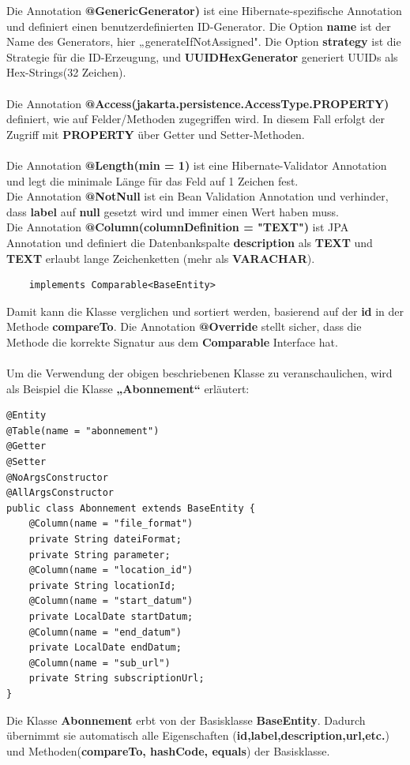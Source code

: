 \documentclass[a4paper,12pt]{scrreprt}
\begin{document}
	Die Annotation \textbf{@GenericGenerator)} ist eine Hibernate-spezifische Annotation und definiert einen benutzerdefinierten ID-Generator. Die Option \textbf{name} ist der Name des Generators, hier „generateIfNotAssigned". Die Option \textbf{strategy} ist die Strategie für die ID-Erzeugung, und \textbf{UUIDHexGenerator} generiert UUIDs als Hex-Strings(32 Zeichen).\\ \\
	Die Annotation \textbf{@Access(jakarta.persistence.AccessType.PROPERTY)} definiert, wie auf Felder/Methoden zugegriffen wird. In diesem Fall erfolgt der Zugriff mit \textbf{PROPERTY} über Getter und Setter-Methoden. \\ \\
	Die Annotation \textbf{@Length(min = 1)} ist eine Hibernate-Validator Annotation und legt die minimale Länge für das Feld auf 1 Zeichen fest.\\
	Die Annotation \textbf{@NotNull} ist ein Bean Validation Annotation und verhinder, dass \textbf{label} auf \textbf{null} gesetzt wird und immer einen Wert haben muss.\\
	Die Annotation \textbf{@Column(columnDefinition = "TEXT")} ist JPA Annotation und definiert die Datenbankspalte \textbf{description} als \textbf{TEXT} und \textbf{TEXT} erlaubt lange Zeichenketten (mehr als \textbf{VARACHAR}). 
\begin{lstlisting}
	implements Comparable<BaseEntity>
\end{lstlisting} Damit kann die Klasse verglichen und sortiert werden, basierend auf der \textbf{id}  in der Methode \textbf{compareTo}.
	Die Annotation \textbf{@Override} stellt sicher, dass die Methode die korrekte Signatur aus dem \textbf{Comparable} Interface hat. \\ \\
	Um die Verwendung der obigen beschriebenen Klasse zu veranschaulichen, wird als Beispiel die Klasse \textbf{„Abonnement“}  erläutert:
\begin{lstlisting}
@Entity
@Table(name = "abonnement")
@Getter
@Setter
@NoArgsConstructor
@AllArgsConstructor
public class Abonnement extends BaseEntity {
	@Column(name = "file_format")
	private String dateiFormat;
	private String parameter;
	@Column(name = "location_id")
	private String locationId;
	@Column(name = "start_datum")
	private LocalDate startDatum;
	@Column(name = "end_datum")
	private LocalDate endDatum;
	@Column(name = "sub_url")
	private String subscriptionUrl;
}
\end{lstlisting}
	Die Klasse \textbf{Abonnement} erbt von der Basisklasse \textbf{BaseEntity}. Dadurch übernimmt sie automatisch alle Eigenschaften (\textbf{id,label,description,url,etc.}) und Methoden(\textbf{compareTo, hashCode, equals}) der Basisklasse.\\
\end{document}
